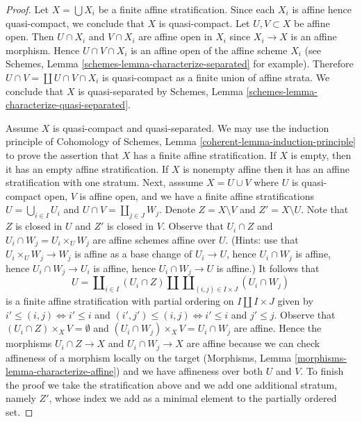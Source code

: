 \begin{proof}
Let $X = \bigcup X_i$ be a finite affine stratification. Since each $X_i$
is affine hence quasi-compact, we conclude that $X$ is quasi-compact.
Let $U, V \subset X$ be affine open. Then $U \cap X_i$ and $V \cap X_i$
are affine open in $X_i$ since $X_i \to X$ is an affine morphism. Hence
$U \cap V \cap X_i$ is an affine open of the affine scheme $X_i$ (see
Schemes, Lemma \ref{schemes-lemma-characterize-separated} for example).
Therefore $U \cap V = \coprod U \cap V \cap X_i$ is quasi-compact
as a finite union of affine strata. We conclude that $X$ is
quasi-separated by Schemes, Lemma
\ref{schemes-lemma-characterize-quasi-separated}.

\medskip\noindent
Assume $X$ is quasi-compact and quasi-separated. We may use the
induction principle of
Cohomology of Schemes, Lemma \ref{coherent-lemma-induction-principle}
to prove the assertion that $X$ has a finite affine stratification.
If $X$ is empty, then it has an empty affine stratification.
If $X$ is nonempty affine then it has an affine stratification
with one stratum. Next, asssume $X = U \cup V$ where $U$ is quasi-compact open,
$V$ is affine open, and we have a finite affine stratifications
$U = \bigcup_{i \in I} U_i$ and $U \cap V = \coprod_{j \in J} W_j$.
Denote $Z = X \setminus V$ and $Z' = X \setminus U$.
Note that $Z$ is closed in $U$ and $Z'$ is closed in $V$.
Observe that $U_i \cap Z$ and $U_i \cap W_j = U_i \times_U W_j$ are affine
schemes affine over $U$. (Hints: use that $U_i \times_U W_j \to W_j$ is
affine as a base change of $U_i \to U$, hence $U_i \cap W_j$ is affine,
hence $U_i \cap W_j \to U_i$ is affine, hence $U_i \cap W_j \to U$ is affine.)
It follows that
$$
U = \coprod\nolimits_{i \in I} (U_i \cap Z) \amalg
\coprod\nolimits_{(i, j) \in I \times J} (U_i \cap W_j)
$$
is a finite affine stratification with partial ordering on
$I \amalg I \times J$ given by $i' \leq (i, j) \Leftrightarrow i' \leq i$
and $(i', j') \leq (i, j) \Leftrightarrow i' \leq i$ and $j' \leq j$.
Observe that $(U_i \cap Z) \times_X V = \emptyset$ and
$(U_i \cap W_j) \times_X V = U_i \cap W_j$ are affine.
Hence the morphisms $U_i \cap Z \to X$ and $U_i \cap W_j \to X$
are affine because we can check affineness of a morphism
locally on the target
(Morphisms, Lemma \ref{morphisms-lemma-characterize-affine})
and we have affineness over both $U$ and $V$.
To finish the proof we take the stratification above
and we add one additional stratum, namely $Z'$,
whose index we add as a minimal element to the partially ordered set.
\end{proof}

